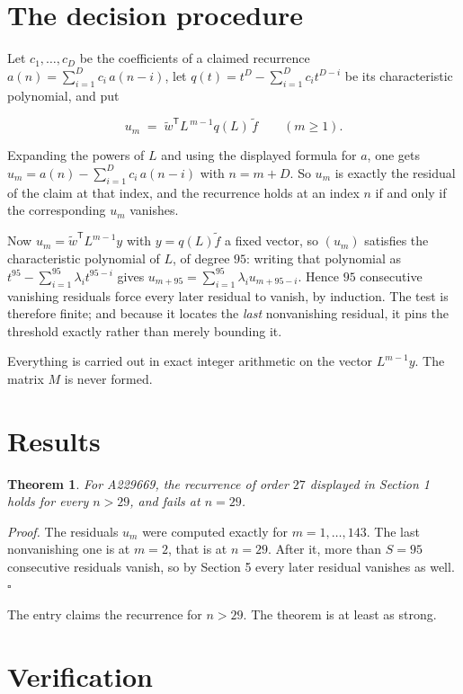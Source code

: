\documentclass[11pt]{article}
\newtheorem{theorem}{Theorem}
\theoremstyle{definition}
\begin{document}
\section{The decision procedure}

Let $c_1,\dots,c_D$ be the coefficients of a claimed recurrence $a(n) = \sum_{i=1}^{D} c_i\,a(n-i)$, let $q(t) = t^{D} - \sum_{i=1}^{D} c_i t^{D-i}$ be its characteristic polynomial, and put

\[u_m \;=\; \tilde w^{\mathsf T} L^{\,m-1} q(L)\,\tilde f \qquad (m \ge 1).\]

Expanding the powers of $L$ and using the displayed formula for $a$, one gets $u_m = a(n) - \sum_{i=1}^{D} c_i\,a(n-i)$ with $n = m + D$. So $u_m$ is exactly the residual of the claim at that index, and the recurrence holds at an index $n$ if and only if the corresponding $u_m$ vanishes.

Now $u_m = \tilde w^{\mathsf T} L^{m-1} y$ with $y = q(L)\tilde f$ a fixed vector, so $(u_m)$ satisfies the characteristic polynomial of $L$, of degree $95$: writing that polynomial as $t^{95} - \sum_{i=1}^{95} \lambda_i t^{95-i}$ gives $u_{m+95} = \sum_{i=1}^{95} \lambda_i u_{m+95-i}$. Hence $95$ consecutive vanishing residuals force every later residual to vanish, by induction. The test is therefore finite; and because it locates the {\itshape last} nonvanishing residual, it pins the threshold exactly rather than merely bounding it.

Everything is carried out in exact integer arithmetic on the vector $L^{m-1}y$. The matrix $M$ is never formed.

\section{Results}

\begin{theorem} For A229669, the recurrence of order $27$ displayed in Section 1 holds for every $n > 29$, and fails at $n = 29$.\end{theorem}

{\itshape Proof.} The residuals $u_m$ were computed exactly for $m = 1,\dots,143$. The last nonvanishing one is at $m = 2$, that is at $n = 29$. After it, more than $S = 95$ consecutive residuals vanish, so by Section 5 every later residual vanishes as well. $\square$

The entry claims the recurrence for $n > 29$. The theorem is at least as strong.

\section{Verification}
\end{document}
